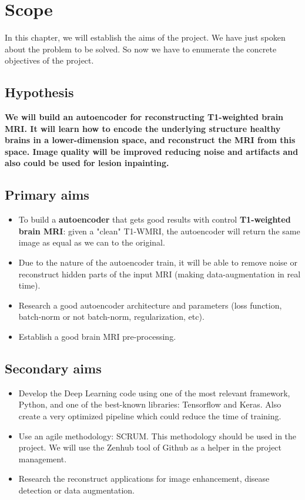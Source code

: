\chapter{Scope}
\label{chapter:scope}

In this chapter, we will establish the aims of the project. We have just spoken about the problem to be solved. So now we have to enumerate the concrete objectives of the project. 

\section{Hypothesis}

\textbf{We will build an autoencoder for reconstructing T1-weighted brain MRI. It will learn how to encode the underlying structure healthy brains in a lower-dimension space, and reconstruct the MRI from this space. Image quality will be improved reducing noise and artifacts and also could be used for lesion inpainting.}

\section{Primary aims}

\begin{itemize}
    \item To build a \textbf{autoencoder} that gets good results with control \textbf{T1-weighted brain MRI}: given a "clean" T1-WMRI, the autoencoder will return the same image as equal as we can to the original.
    \item Due to the nature of the autoencoder train, it will be able to remove noise or reconstruct hidden parts of the input MRI (making data-augmentation in real time).
    \item Research a good autoencoder architecture and parameters (loss function, batch-norm or not batch-norm, regularization, etc).
    \item Establish a good brain MRI pre-processing.
\end{itemize}

\section{Secondary aims}

\begin{itemize}
    \item Develop the Deep Learning code using one of the most relevant framework, Python, and one of the best-known libraries: Tensorflow and Keras. Also create a very optimized pipeline which could reduce the time of training.
    \item Use an agile methodology: SCRUM. This methodology should be used in the project. We will use the Zenhub tool of Github as a helper in the project management.
    \item Research the reconstruct applications for image enhancement, disease detection or data augmentation.
\end{itemize}


